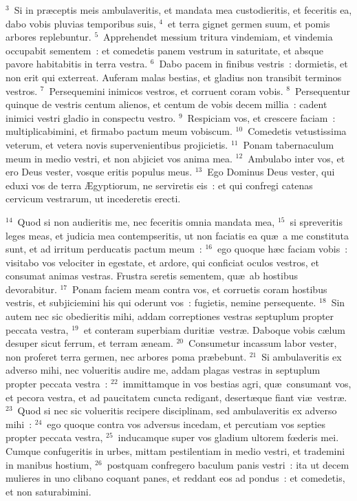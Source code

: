 ${}^{3}$~Si in pr\ae ceptis meis ambulaveritis, et mandata mea custodieritis, et feceritis ea, dabo vobis pluvias temporibus suis,
${}^{4}$~et terra gignet germen suum, et pomis arbores replebuntur.
${}^{5}$~Apprehendet messium tritura vindemiam, et vindemia occupabit sementem~: et comedetis panem vestrum in saturitate, et absque pavore habitabitis in terra vestra.
${}^{6}$~Dabo pacem in finibus vestris~: dormietis, et non erit qui exterreat. Auferam malas bestias, et gladius non transibit terminos vestros.
${}^{7}$~Persequemini inimicos vestros, et corruent coram vobis.
${}^{8}$~Persequentur quinque de vestris centum alienos, et centum de vobis decem millia~: cadent inimici vestri gladio in conspectu vestro.
${}^{9}$~Respiciam vos, et crescere faciam~: multiplicabimini, et firmabo pactum meum vobiscum.
${}^{10}$~Comedetis vetustissima veterum, et vetera novis supervenientibus projicietis.
${}^{11}$~Ponam tabernaculum meum in medio vestri, et non abjiciet vos anima mea.
${}^{12}$~Ambulabo inter vos, et ero Deus vester, vosque eritis populus meus.
${}^{13}$~Ego Dominus Deus vester, qui eduxi vos de terra \AE gyptiorum, ne serviretis eis~: et qui confregi catenas cervicum vestrarum, ut incederetis erecti.


${}^{14}$~Quod si non audieritis me, nec feceritis omnia mandata mea,
${}^{15}$~si spreveritis leges meas, et judicia mea contempseritis, ut non faciatis ea qu\ae\ a me constituta sunt, et ad irritum perducatis pactum meum~:
${}^{16}$~ego quoque h\ae c faciam vobis~: visitabo vos velociter in egestate, et ardore, qui conficiat oculos vestros, et consumat animas vestras. Frustra seretis sementem, qu\ae\ ab hostibus devorabitur.
${}^{17}$~Ponam faciem meam contra vos, et corruetis coram hostibus vestris, et subjiciemini his qui oderunt vos~: fugietis, nemine persequente.
${}^{18}$~Sin autem nec sic obedieritis mihi, addam correptiones vestras septuplum propter peccata vestra,
${}^{19}$~et conteram superbiam duriti\ae\ vestr\ae . Daboque vobis c\ae lum desuper sicut ferrum, et terram \ae neam.
${}^{20}$~Consumetur incassum labor vester, non proferet terra germen, nec arbores poma pr\ae bebunt.
${}^{21}$~Si ambulaveritis ex adverso mihi, nec volueritis audire me, addam plagas vestras in septuplum propter peccata vestra~:
${}^{22}$~immittamque in vos bestias agri, qu\ae\ consumant vos, et pecora vestra, et ad paucitatem cuncta redigant, desert\ae que fiant vi\ae\ vestr\ae .
${}^{23}$~Quod si nec sic volueritis recipere disciplinam, sed ambulaveritis ex adverso mihi~:
${}^{24}$~ego quoque contra vos adversus incedam, et percutiam vos septies propter peccata vestra,
${}^{25}$~inducamque super vos gladium ultorem fœderis mei. Cumque confugeritis in urbes, mittam pestilentiam in medio vestri, et trademini in manibus hostium,
${}^{26}$~postquam confregero baculum panis vestri~: ita ut decem mulieres in uno clibano coquant panes, et reddant eos ad pondus~: et comedetis, et non saturabimini.


